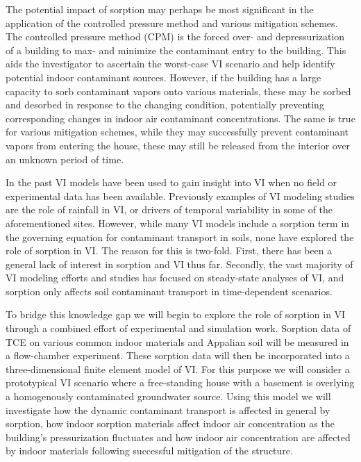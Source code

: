 The potential impact of sorption may perhaps be most significant in the application of the controlled pressure method and various mitigation schemes.
The controlled pressure method (CPM) is the forced over- and depressurization of a building to max- and minimize the contaminant entry to the building.
This aids the investigator to ascertain the worst-case VI scenario and help identify potential indoor contaminant sources\cite{mchugh_recent_2017,holton_long-term_2015}.
However, if the building has a large capacity to sorb contaminant vapors onto various materials, these may be sorbed and desorbed in response to the changing condition, potentially preventing corresponding changes in indoor air contaminant concentrations.
The same is true for various mitigation schemes, while they may successfully prevent contaminant vapors from entering the house, these may still be released from the interior over an unknown period of time\cite{meininghaus_diffusion_2000,meininghaus_diffusion_2002}.\par

In the past VI models have been used to gain insight into VI when no field or experimental data has been available.
Previously examples of VI modeling studies are the role of rainfall in VI\cite{shen_numerical_2012}, or drivers of temporal variability in some of the aforementioned sites\cite{strom_factors_2019}.
However, while many VI models include a sorption term in the governing equation for contaminant transport in soils, none have explored the role of sorption in VI.
The reason for this is two-fold.
First, there has been a general lack of interest in sorption and VI thus far.
Secondly, the vast majority of VI modeling efforts and studies has focused on steady-state analyses of VI, and sorption only affects soil contaminant transport in time-dependent scenarios.\par

To bridge this knowledge gap we will begin to explore the role of sorption in VI through a combined effort of experimental and simulation work.
Sorption data of TCE on various common indoor materials and Appalian soil will be measured in a flow-chamber experiment. %
These sorption data will then be incorporated into a three-dimensional finite element model of VI.
For this purpose we will consider a prototypical VI scenario where a free-standing house with a basement is overlying a homogenously contaminated groundwater source.
Using this model we will investigate how the dynamic contaminant transport is affected in general by sorption, how indoor sorption materials affect indoor air concentration as the building's pressurization fluctuates and how indoor air concentration are affected by indoor materials following successful mitigation of the structure.

